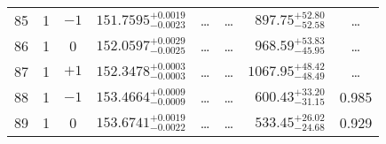\begin{table*}[!]
\begin{tabular}{llcrrlrc}
85 & 1 & $-1$ & $    151.7595_{-      0.0023}^{+      0.0019}$ & \multicolumn{1}{c}{\dots} & \multicolumn{1}{c}{\dots} & $      897.75_{-       52.58}^{+       52.80}$ & \dots\\[1pt]
86 & 1 & 0 & $    152.0597_{-      0.0025}^{+      0.0029}$ & \multicolumn{1}{c}{\dots} & \multicolumn{1}{c}{\dots} & $      968.59_{-       45.95}^{+       53.83}$ & \dots \\[1pt]
87 & 1 & $+1$ & $    152.3478_{-      0.0003}^{+      0.0003}$ & \multicolumn{1}{c}{\dots} & \multicolumn{1}{c}{\dots} & $     1067.95_{-       48.49}^{+       48.42}$ & \dots \\[1pt]
88 & 1 & $-1$ & $    153.4664_{-      0.0009}^{+      0.0009}$ & \multicolumn{1}{c}{\dots} & \multicolumn{1}{c}{\dots} & $      600.43_{-       31.15}^{+       33.20}$ & 0.985\\[1pt]
89 & 1 & 0 & $    153.6741_{-      0.0022}^{+      0.0019}$ & \multicolumn{1}{c}{\dots} & \multicolumn{1}{c}{\dots} & $      533.45_{-       24.68}^{+       26.02}$ & 0.929\\[1pt]


\end{tabular}
\end{table*}
